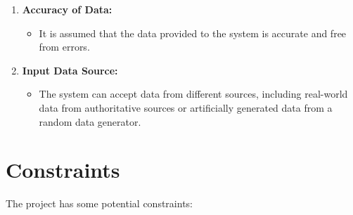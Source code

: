 \documentclass[english,12pt,a4paper]{report}
\begin{document}
\begin{enumerate}
	\item \textbf{Accuracy of Data:} 
	\begin{itemize}
	\item It is assumed that the data provided to the system is accurate and free from errors.
	\end{itemize}

	\item \textbf{Input Data Source:} 
	\begin{itemize}
		\item The system can accept data from different sources, including real-world data from authoritative sources or artificially generated data from a random data generator.
	\end{itemize}
	\end{enumerate}
	
	\section{Constraints}
	The project has some potential constraints:
\end{document}
